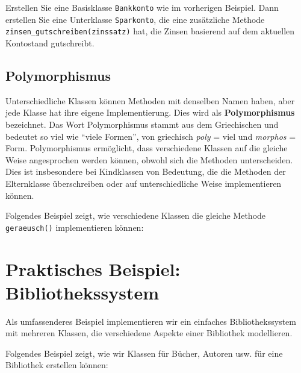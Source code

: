 \begin{myexercise}
	Erstellen Sie eine Basisklasse \lstinline|Bankkonto| wie im vorherigen Beispiel. Dann erstellen Sie eine Unterklasse \lstinline|Sparkonto|, die eine zusätzliche Methode \lstinline|zinsen_gutschreiben(zinssatz)| hat, die Zinsen basierend auf dem aktuellen Kontostand gutschreibt.

	\begin{myanswer}
		\leavevmode
		
	\end{myanswer}
\end{myexercise}

\subsection{Polymorphismus}
Unterschiedliche Klassen können Methoden mit denselben Namen haben, aber jede Klasse hat ihre eigene Implementierung. Dies wird als \textbf{Polymorphismus} bezeichnet. Das Wort Polymorphismus stammt aus dem Griechischen und bedeutet so viel wie \enquote{viele Formen}, von griechisch \textit{poly} = viel und \textit{morphos} = Form. Polymorphismus ermöglicht, dass verschiedene Klassen auf die gleiche Weise angesprochen werden können, obwohl sich die Methoden unterscheiden. Dies ist insbesondere bei Kindklassen von Bedeutung, die die Methoden der Elternklasse überschreiben oder auf unterschiedliche Weise implementieren können.

\begin{myexample}[Polymorphismus] Folgendes Beispiel zeigt, wie verschiedene Klassen die gleiche Methode \lstinline|geraeusch()| implementieren können:
	\leavevmode

\end{myexample}


\section{Praktisches Beispiel: Bibliothekssystem}

Als umfassenderes Beispiel implementieren wir ein einfaches Bibliothekssystem mit mehreren Klassen, die verschiedene Aspekte einer Bibliothek modellieren.

\begin{myexample}[Bibliothekssystem]Folgendes Beispiel zeigt, wie wir Klassen für Bücher, Autoren usw. für eine Bibliothek erstellen können:

\end{myexample}

